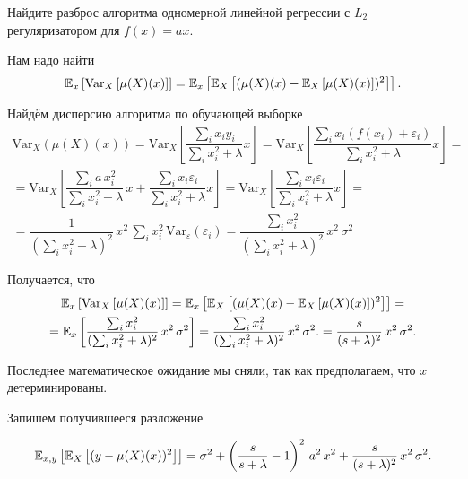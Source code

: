 \documentclass[12pt,fleqn]{article}
\begin{document}
\begin{vkProblem}
Найдите разброс алгоритма одномерной линейной регрессии с $L_2$ регуляризатором для $f(x) = ax$. 
\end{vkProblem}
\begin{esSolution}
    Нам надо найти
    $$
    \mathbb{E}_{x}\left[\text{Var}_X\left[\mu(X)(x)\right]\right]
    =
    \mathbb{E}_{x} \left[\mathbb{E}_{X} \left[(\mu(X)(x) - \mathbb{E}_{X}\left[\mu(X)(x)\right] )^2 \right]\right].
    $$

    Найдём дисперсию алгоритма по обучающей выборке 
    \begin{multline*}
        \text{Var}_X(\mu(X)(x))
        =
        \text{Var}_X \left[ \dfrac{\sum_i x_i y_i}{\sum_i x_i^2 + \lambda} x \right]
        =
        \text{Var}_X \left[ \dfrac{\sum_i x_i (f(x_i) + \varepsilon_i)}{\sum_i x_i^2 + \lambda} x \right]
        = \\ =
        \text{Var}_X \left[ \dfrac{\sum_i a \, x_i^2}{\sum_i x_i^2 + \lambda} \, x  + \dfrac{\sum_i x_i \varepsilon_i}{\sum_i x_i^2 + \lambda} x \right]
        = 
        \text{Var}_X \left[ \dfrac{\sum_i x_i \varepsilon_i}{\sum_i x_i^2 + \lambda} x \right]
        = \\ = 
        \dfrac{1}{(\sum_i x_i^2 + \lambda)^2} \, x^2 \, \sum_i x_i^2  \, \text{Var}_{\varepsilon}(\varepsilon_i)
        =
        \dfrac{\sum_i x_i^2}{(\sum_i x_i^2 + \lambda)^2} \, x^2 \, \sigma^2 
    \end{multline*}

    Получается, что 
    \begin{multline*}
        \mathbb{E}_{x}\left[\text{Var}_X\left[\mu(X)(x)\right]\right]
        =
        \mathbb{E}_{x} \left[\mathbb{E}_{X} \left[(\mu(X)(x) - \mathbb{E}_{X}\left[\mu(X)(x)\right] )^2 \right]\right] 
        = \\ =
        \mathbb{E}_{x}\left[\dfrac{\sum_i x_i^2}{(\sum_i x_i^2 + \lambda)^2} \, x^2 \, \sigma^2 \right] 
        = 
        \dfrac{\sum_i x_i^2}{(\sum_i x_i^2 + \lambda)^2} \, x^2 \, \sigma^2 .
        = \dfrac{s}{(s + \lambda)^2} \, x^2 \, \sigma^2 .
    \end{multline*}

    Последнее математическое ожидание мы сняли, так как предполагаем, что $x$ детерминированы. 
\end{esSolution}

Запишем получившееся разложение

$$
\mathbb{E}_{x, y}\left[\mathbb{E}_{X}\left[ (y - \mu(X)(x))^2 \right]\right]
=
\sigma^2 + \left(\dfrac{s}{s + \lambda} - 1\right)^2\, a^2\, x^2 + \dfrac{s}{(s + \lambda)^2} \, x^2 \, \sigma^2 .
$$
\end{document}
